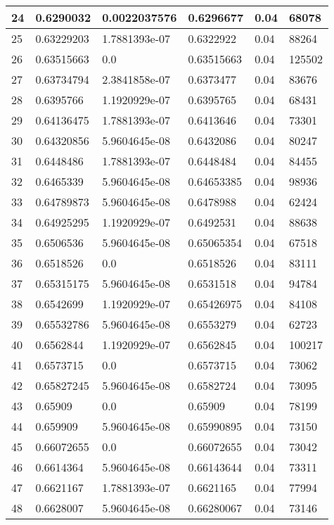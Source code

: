 \begin{longtable}{|l|l|l|l|l|l|}
24 & 0.6290032 & 0.0022037576 & 0.6296677 & 0.04 & 68078 \\ \hline 
25 & 0.63229203 & 1.7881393e-07 & 0.6322922 & 0.04 & 88264 \\ \hline 
26 & 0.63515663 & 0.0 & 0.63515663 & 0.04 & 125502 \\ \hline 
27 & 0.63734794 & 2.3841858e-07 & 0.6373477 & 0.04 & 83676 \\ \hline 
28 & 0.6395766 & 1.1920929e-07 & 0.6395765 & 0.04 & 68431 \\ \hline 
29 & 0.64136475 & 1.7881393e-07 & 0.6413646 & 0.04 & 73301 \\ \hline 
30 & 0.64320856 & 5.9604645e-08 & 0.6432086 & 0.04 & 80247 \\ \hline 
31 & 0.6448486 & 1.7881393e-07 & 0.6448484 & 0.04 & 84455 \\ \hline 
32 & 0.6465339 & 5.9604645e-08 & 0.64653385 & 0.04 & 98936 \\ \hline 
33 & 0.64789873 & 5.9604645e-08 & 0.6478988 & 0.04 & 62424 \\ \hline 
34 & 0.64925295 & 1.1920929e-07 & 0.6492531 & 0.04 & 88638 \\ \hline 
35 & 0.6506536 & 5.9604645e-08 & 0.65065354 & 0.04 & 67518 \\ \hline 
36 & 0.6518526 & 0.0 & 0.6518526 & 0.04 & 83111 \\ \hline 
37 & 0.65315175 & 5.9604645e-08 & 0.6531518 & 0.04 & 94784 \\ \hline 
38 & 0.6542699 & 1.1920929e-07 & 0.65426975 & 0.04 & 84108 \\ \hline 
39 & 0.65532786 & 5.9604645e-08 & 0.6553279 & 0.04 & 62723 \\ \hline 
40 & 0.6562844 & 1.1920929e-07 & 0.6562845 & 0.04 & 100217 \\ \hline 
41 & 0.6573715 & 0.0 & 0.6573715 & 0.04 & 73062 \\ \hline 
42 & 0.65827245 & 5.9604645e-08 & 0.6582724 & 0.04 & 73095 \\ \hline 
43 & 0.65909 & 0.0 & 0.65909 & 0.04 & 78199 \\ \hline 
44 & 0.659909 & 5.9604645e-08 & 0.65990895 & 0.04 & 73150 \\ \hline 
45 & 0.66072655 & 0.0 & 0.66072655 & 0.04 & 73042 \\ \hline 
46 & 0.6614364 & 5.9604645e-08 & 0.66143644 & 0.04 & 73311 \\ \hline 
47 & 0.6621167 & 1.7881393e-07 & 0.6621165 & 0.04 & 77994 \\ \hline 
48 & 0.6628007 & 5.9604645e-08 & 0.66280067 & 0.04 & 73146 \\ \hline 

\end{longtable}
